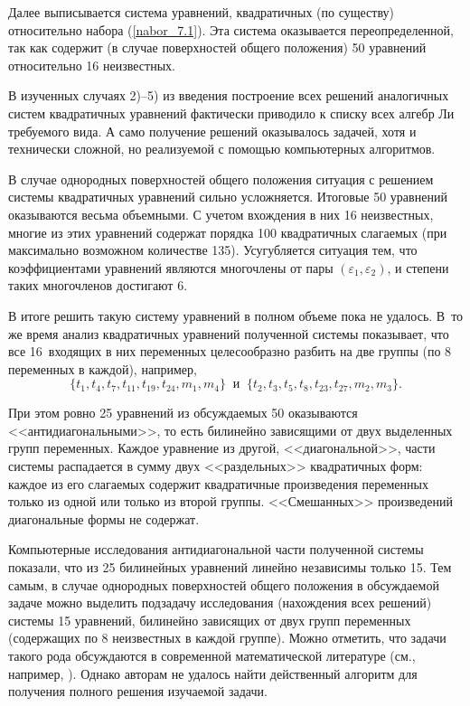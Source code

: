   Далее выписывается система уравнений, квадратичных (по существу)
относительно набора (\ref{nabor_7.1}). Эта система оказывается переопределенной, так как
содержит (в случае поверхностей общего положения) 50 уравнений относительно
16 неизвестных.

  В изученных случаях 2)--5) из введения построение всех решений
аналогичных систем квадратичных уравнений фактически приводило к списку всех
алгебр Ли требуемого вида. А само получение решений оказывалось задачей,
хотя и технически сложной, но реализуемой с помощью компьютерных алгоритмов.

  В случае однородных поверхностей общего положения ситуация с
решением системы квадратичных уравнений сильно усложняется.
 Итоговые 50 уравнений оказываются весьма объемными. С учетом вхождения в них
16 неизвестных, многие из этих уравнений содержат порядка 100 квадратичных слагаемых
(при максимально возможном количестве 135). Усугубляется ситуация тем, что
коэффициентами уравнений являются многочлены от пары $ (\varepsilon_1, \varepsilon_2) $,
и степени таких многочленов достигают 6.

   В итоге решить такую систему уравнений в полном объеме пока не удалось. В~то же
время анализ квадратичных уравнений полученной системы показывает, что все 16~входящих
в них переменных целесообразно разбить на две группы (по 8 переменных в каждой), например,
\begin{equation}
  \{ t_1, t_4, t_7, t_{11}, t_{19}, t_{24}, m_1, m_4
\} \
\mbox{ и } \
\{ t_2, t_3, t_5, t_8, t_{23}, t_{27}, m_2, m_3 \}. \label{nabor_8.1}
\end{equation}


  При этом ровно 25 уравнений из обсуждаемых 50 оказываются <<антидиагональными>>, то есть
билинейно зависящими от двух выделенных
групп переменных. Каждое уравнение из другой, <<диагональной>>, части системы распадается
в сумму двух
<<раздельных>> квадратичных форм: каждое из его слагаемых содержит квадратичные произведения
переменных только из одной или только из второй группы. <<Смешанных>> произведений диагональные
формы не содержат.

   Компьютерные исследования антидиагональной части полученной системы показали, что из 25
билинейных уравнений линейно независимы только 15. Тем самым, в случае однородных
поверхностей общего положения в обсуждаемой задаче можно выделить подзадачу исследования
(нахождения всех решений) системы 15 уравнений, билинейно зависящих от двух групп переменных
(содержащих по 8 неизвестных в каждой группе). Можно отметить, что задачи такого рода
обсуждаются в современной математической литературе (см., например, \cite{BilinSyst}). Однако авторам
не удалось найти действенный алгоритм для получения полного решения изучаемой задачи.

